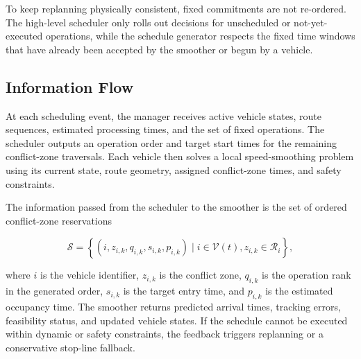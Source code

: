 \begin{addedblock}
To keep replanning physically consistent, fixed commitments are not re-ordered. The high-level scheduler only rolls out decisions for unscheduled or not-yet-executed operations, while the schedule generator respects the fixed time windows that have already been accepted by the smoother or begun by a vehicle.
\end{addedblock}

\subsection{Information Flow}
At each scheduling event, the manager receives active vehicle states, route sequences, estimated processing times, and the set of fixed operations. The scheduler outputs an operation order and target start times for the remaining conflict-zone traversals. Each vehicle then solves a local speed-smoothing problem using its current state, route geometry, assigned conflict-zone times, and safety constraints.

\begin{addedblock}
The information passed from the scheduler to the smoother is the set of ordered conflict-zone reservations
\end{addedblock}
\begin{equation}
  \mathcal{S} = \left\{(i,z_{i,k},q_{i,k},s_{i,k},p_{i,k}) \mid i \in \mathcal{V}(t), z_{i,k} \in \mathcal{R}_i \right\},
  \label{eq:scheduler_smoother_interface}
\end{equation}
\begin{addedblock}
where $i$ is the vehicle identifier, $z_{i,k}$ is the conflict zone, $q_{i,k}$ is the operation rank in the generated order, $s_{i,k}$ is the target entry time, and $p_{i,k}$ is the estimated occupancy time. The smoother returns predicted arrival times, tracking errors, feasibility status, and updated vehicle states. If the schedule cannot be executed within dynamic or safety constraints, the feedback triggers replanning or a conservative stop-line fallback.
\end{addedblock}

